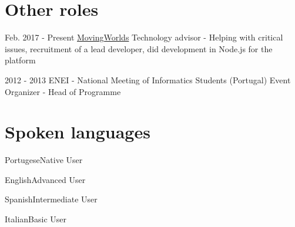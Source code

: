 \documentclass{tccv}
\begin{document}
\section{Other roles}

\begin{yearlist}

\item{Feb. 2017 - Present}
     {\href{https://movingworlds.org/}{MovingWorlds}}
     {Technology advisor - Helping with critical issues, recruitment of a lead developer,
      did development in Node.js for the platform }

\item{2012 - 2013}
     {ENEI - National Meeting of Informatics Students (Portugal)}
     {Event Organizer - Head of Programme}

\end{yearlist}

\section{Spoken languages}

\begin{factlist}
\item{Portugese}{Native User}
\item{English}{Advanced User}
\item{Spanish}{Intermediate User}
\item{Italian}{Basic User}
\end{factlist}
\end{document}
